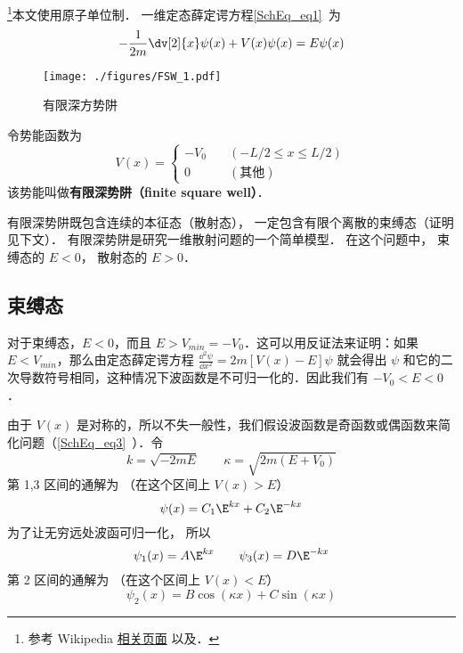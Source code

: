 
\begin{issues}
\issueTODO
\end{issues}




\footnote{参考 Wikipedia \href{https://en.wikipedia.org/wiki/Finite_potential_well}{相关页面} 以及\cite{GriffQ}．}本文使用原子单位制． 一维定态薛定谔方程\autoref{SchEq_eq1}~为
\begin{equation}
-\frac{1}{2m}\dv[2]{x}\psi(x) + V(x) \psi(x) = E \psi(x)
\end{equation}

\begin{figure}[ht]
\centering
\texttt{[image: ./figures/FSW\_1.pdf]}
\caption{有限深方势阱} \label{FSW_fig1}
\end{figure}
令势能函数为
\begin{equation}
V(x) = \begin{cases}
-V_0 \quad &(-L/2 \leqslant x \leqslant L/2)\\
0 \quad &(\text{其他})
\end{cases}
\end{equation}
该势能叫做\textbf{有限深势阱（finite square well）}．

有限深势阱既包含连续的本征态（散射态）， 一定包含有限个离散的束缚态（证明见下文）． 有限深势阱是研究一维散射问题的一个简单模型． 在这个问题中， 束缚态的 $E<0$， 散射态的 $E>0$．

\subsection{束缚态}
对于束缚态，$E<0$，而且 $E> V_{min}=-V_0$．这可以用反证法来证明：如果 $E<V_{min}$，那么由定态薛定谔方程 $\frac{\dd {^2}\psi}{\dd x^2}=2m[V(x)-E]\psi$ 就会得出 $\psi$ 和它的二次导数符号相同，这种情况下波函数是不可归一化的．因此我们有 $-V_0<E<0$．

由于 $V(x)$ 是对称的，所以不失一般性，我们假设波函数是奇函数或偶函数来简化问题（\autoref{SchEq_eq3}~）．令
\begin{equation}\label{FSW_eq4}
k = \sqrt{-2mE} \qquad \kappa = \sqrt{2m(E + V_0)}
\end{equation}
第 1,3 区间的通解为 （在这个区间上 $V(x) > E$）
\begin{equation}
\psi(x) = C_1 \E^{kx} + C_2 \E^{-kx}
\end{equation}
为了让无穷远处波函可归一化， 所以
\begin{equation}
\psi_1(x) = A \E^{kx} \qquad \psi_3(x) = D\E^{-kx}
\end{equation}
第 2 区间的通解为 （在这个区间上 $V(x) < E$）
\begin{equation}
\psi_2(x) = B \cos(\kappa x) + C\sin(\kappa x)
\end{equation}


